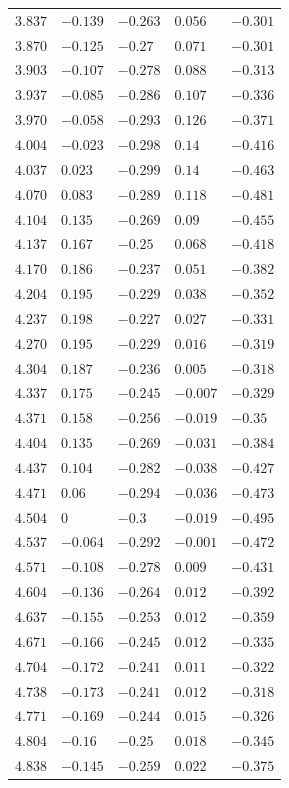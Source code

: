 \begin{center}
\begin{longtable}{lllll}
$3.837$&$-0.139$&$-0.263$&$0.056$&$-0.301$\\
$3.870$&$-0.125$&$-0.27$&$0.071$&$-0.301$\\
$3.903$&$-0.107$&$-0.278$&$0.088$&$-0.313$\\
$3.937$&$-0.085$&$-0.286$&$0.107$&$-0.336$\\
$3.970$&$-0.058$&$-0.293$&$0.126$&$-0.371$\\
$4.004$&$-0.023$&$-0.298$&$0.14$&$-0.416$\\
$4.037$&$0.023$&$-0.299$&$0.14$&$-0.463$\\
$4.070$&$0.083$&$-0.289$&$0.118$&$-0.481$\\
$4.104$&$0.135$&$-0.269$&$0.09$&$-0.455$\\
$4.137$&$0.167$&$-0.25$&$0.068$&$-0.418$\\
$4.170$&$0.186$&$-0.237$&$0.051$&$-0.382$\\
$4.204$&$0.195$&$-0.229$&$0.038$&$-0.352$\\
$4.237$&$0.198$&$-0.227$&$0.027$&$-0.331$\\
$4.270$&$0.195$&$-0.229$&$0.016$&$-0.319$\\
$4.304$&$0.187$&$-0.236$&$0.005$&$-0.318$\\
$4.337$&$0.175$&$-0.245$&$-0.007$&$-0.329$\\
$4.371$&$0.158$&$-0.256$&$-0.019$&$-0.35$\\
$4.404$&$0.135$&$-0.269$&$-0.031$&$-0.384$\\
$4.437$&$0.104$&$-0.282$&$-0.038$&$-0.427$\\
$4.471$&$0.06$&$-0.294$&$-0.036$&$-0.473$\\
$4.504$&$0$&$-0.3$&$-0.019$&$-0.495$\\
$4.537$&$-0.064$&$-0.292$&$-0.001$&$-0.472$\\
$4.571$&$-0.108$&$-0.278$&$0.009$&$-0.431$\\
$4.604$&$-0.136$&$-0.264$&$0.012$&$-0.392$\\
$4.637$&$-0.155$&$-0.253$&$0.012$&$-0.359$\\
$4.671$&$-0.166$&$-0.245$&$0.012$&$-0.335$\\
$4.704$&$-0.172$&$-0.241$&$0.011$&$-0.322$\\
$4.738$&$-0.173$&$-0.241$&$0.012$&$-0.318$\\
$4.771$&$-0.169$&$-0.244$&$0.015$&$-0.326$\\
$4.804$&$-0.16$&$-0.25$&$0.018$&$-0.345$\\
$4.838$&$-0.145$&$-0.259$&$0.022$&$-0.375$\\

\end{longtable}
\end{center}
